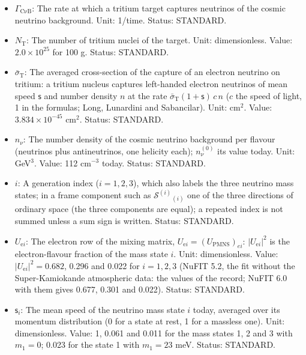 \documentclass[
  10pt,
]{article}
\providecommand{\tightlist}{%
  \setlength{\itemsep}{0pt}\setlength{\parskip}{0pt}}
\begin{document}
\begin{itemize}
\tightlist
\item
  \(\Gamma_{\mathrm{C\nu B}}\): The rate at which a tritium target
  captures neutrinos of the cosmic neutrino background. Unit: 1/time.
  Status: STANDARD.
\item
  \(N_{\mathrm{T}}\): The number of tritium nuclei of the target. Unit:
  dimensionless. Value: \(2.0\times10^{25}\) for 100 g. Status:
  STANDARD.
\item
  \(\bar\sigma_{\mathrm{T}}\): The averaged cross-section of the capture
  of an electron neutrino on tritium: a tritium nucleus captures
  left-handed electron neutrinos of mean speed \(\mathsf{s}\) and number
  density \(n\) at the rate
  \(\bar\sigma_{\mathrm{T}}(1 + \mathsf{s})\,c\,n\) (\(c\) the speed of
  light, 1 in the formulas; Long, Lunardini and Sabancilar). Unit:
  cm\(^2\). Value: \(3.834\times10^{-45}\) cm\(^2\). Status: STANDARD.
\item
  \(n_\nu\): The number density of the cosmic neutrino background per
  flavour (neutrinos plus antineutrinos, one helicity each);
  \(n_\nu^{(0)}\) its value today. Unit: GeV\(^3\). Value: 112
  cm\(^{-3}\) today. Status: STANDARD.
\item
  \(i\): A generation index (\(i = 1, 2, 3\)), which also labels the
  three neutrino mass states; in a frame component such as
  \(\mathcal{S}^{(i)}{}_{(i)}\) one of the three directions of ordinary
  space (the three components are equal); a repeated index is not summed
  unless a sum sign is written. Status: STANDARD.
\item
  \(U_{\mathrm{e}i}\): The electron row of the mixing matrix,
  \(U_{\mathrm{e}i} = (U_{\mathrm{PMNS}})_{ei}\):
  \(\lvert U_{\mathrm{e}i}\rvert^2\) is the electron-flavour fraction of
  the mass state \(i\). Unit: dimensionless. Value:
  \(\lvert U_{\mathrm{e}i}\rvert^2 = 0.682\), 0.296 and 0.022 for
  \(i = 1, 2, 3\) (NuFIT 5.2, the fit without the Super-Kamiokande
  atmospheric data: the values of the record; NuFIT 6.0 with them gives
  0.677, 0.301 and 0.022). Status: STANDARD.
\item
  \(\mathsf{s}_i\): The mean speed of the neutrino mass state \(i\)
  today, averaged over its momentum distribution (0 for a state at rest,
  1 for a massless one). Unit: dimensionless. Value: 1, 0.061 and 0.011
  for the mass states 1, 2 and 3 with \(m_1 = 0\); 0.023 for the state 1
  with \(m_1 = 23\) meV. Status: STANDARD.
\end{itemize}
\end{document}
